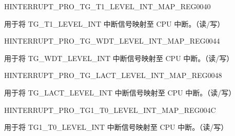 \begin{register}{H}{INTERRUPT\_PRO\_TG\_T1\_LEVEL\_INT\_MAP\_REG}{\hexprefix{}0040}\label{regdesc:INTERRUPTPROTGT1LEVELINTMAPREG}
%
%
\regnewline%
\begin{regdesc}\begin{reglist}
\label{fielddesc:INTERRUPTPROTGT1LEVELINTMAP}\item [INTERRUPT\_PRO\_TG\_T1\_LEVEL\_INT\_MAP] 用于将 TG\_T1\_LEVEL\_INT 中断信号映射至 CPU 中断。（读/写）
\end{reglist}\end{regdesc}
\end{register}


\begin{register}{H}{INTERRUPT\_PRO\_TG\_WDT\_LEVEL\_INT\_MAP\_REG}{\hexprefix{}0044}\label{regdesc:INTERRUPTPROTGWDTLEVELINTMAPREG}
%
%
\regnewline%
\begin{regdesc}\begin{reglist}
\label{fielddesc:INTERRUPTPROTGWDTLEVELINTMAP}\item [INTERRUPT\_PRO\_TG\_WDT\_LEVEL\_INT\_MAP] 用于将 TG\_WDT\_LEVEL\_INT 中断信号映射至 CPU 中断。（读/写）
\end{reglist}\end{regdesc}
\end{register}


\begin{register}{H}{INTERRUPT\_PRO\_TG\_LACT\_LEVEL\_INT\_MAP\_REG}{\hexprefix{}0048}\label{regdesc:INTERRUPTPROTGLACTLEVELINTMAPREG}
%
%
\regnewline%
\begin{regdesc}\begin{reglist}
\label{fielddesc:INTERRUPTPROTGLACTLEVELINTMAP}\item [INTERRUPT\_PRO\_TG\_LACT\_LEVEL\_INT\_MAP] 用于将 TG\_LACT\_LEVEL\_INT 中断信号映射至 CPU 中断。（读/写）
\end{reglist}\end{regdesc}
\end{register}


\begin{register}{H}{INTERRUPT\_PRO\_TG1\_T0\_LEVEL\_INT\_MAP\_REG}{\hexprefix{}004C}\label{regdesc:INTERRUPTPROTG1T0LEVELINTMAPREG}
%
%
\regnewline%
\begin{regdesc}\begin{reglist}
\label{fielddesc:INTERRUPTPROTG1T0LEVELINTMAP}\item [INTERRUPT\_PRO\_TG1\_T0\_LEVEL\_INT\_MAP] 用于将 TG1\_T0\_LEVEL\_INT 中断信号映射至 CPU 中断。（读/写）
\end{reglist}\end{regdesc}
\end{register}


